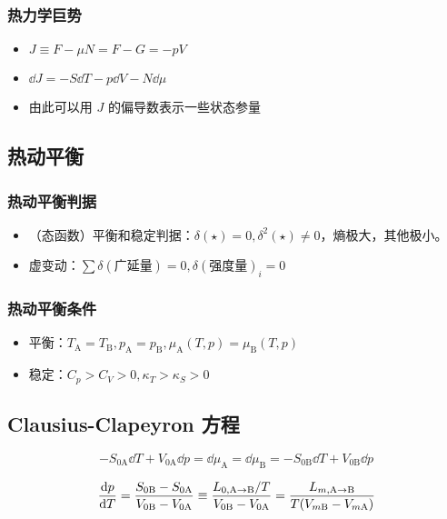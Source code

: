 \subsubsection{热力学巨势}
\begin{itemize}
    \item $J \equiv F - \mu N = F - G = - p V$
    \item $\dd{J} = -S \dd{T} - p \dd{V} - N \dd{\mu}$
    \item 由此可以用 $J$ 的偏导数表示一些状态参量
\end{itemize}

\subsection{热动平衡}

\subsubsection{热动平衡判据}

\begin{itemize}
    \item （态函数）平衡和稳定判据：$\delta (\star) = 0, \delta^2 (\star) \neq 0$，熵极大，其他极小。
    \item 虚变动：$\sum \delta (\text{广延量}) = 0, \delta (\text{强度量})_i = 0$
\end{itemize}

\subsubsection{热动平衡条件}

\begin{itemize}
    \item 平衡：$T_{\text{A}} = T_{\text{B}}, p_{\text{A}} = p_{\text{B}}, \mu_{\text{A}} (T, p) = \mu_{\text{B}} (T, p)$
    \item 稳定：$C_p > C_V > 0, \kappa_T > \kappa_S > 0$
\end{itemize}

\subsection{Clausius-Clapeyron 方程}

\[
- S_{0\text{A}} \dd{T} + V_{0\text{A}} \dd{p} = \dd{\mu_\text{A}} = \dd{\mu_\text{B}} = - S_{0\text{B}} \dd{T} + V_{0\text{B}} \dd{p}
\]

\[
\dv{p}{T} = \frac{S_{0\text{B}} - S_{0\text{A}}}{V_{0\text{B}} - V_{0\text{A}}} \equiv \frac{L_{0, \text{A} \rightarrow \text{B}} / T}{V_{0\text{B}} - V_{0\text{A}}} = \frac{L_{m, \text{A} \rightarrow \text{B}}}{T (V_{m\text{B}} - V_{m\text{A}})}
\]

